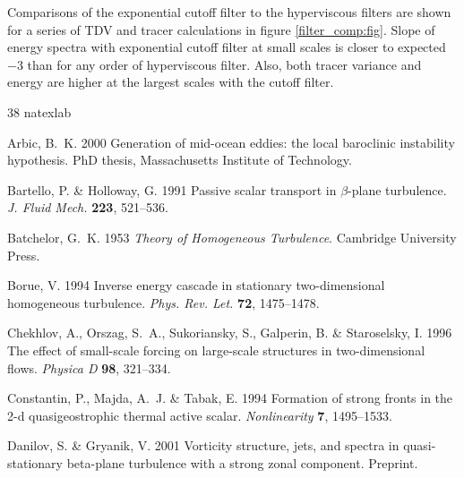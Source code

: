 \documentclass{jfm}
\begin{document}
Comparisons of the exponential cutoff filter to the hyperviscous
filters are shown for a series of TDV and tracer calculations in
figure \ref{filter_comp:fig}.  Slope of energy spectra with
exponential cutoff filter at small scales is closer to expected $-3$
than for any order of hyperviscous filter.  Also, both tracer variance
and energy are higher at the largest scales with the cutoff filter.


%


\begin{thebibliography}{38}
\expandafter\ifx\csname natexlab\endcsname\relax\def\natexlab#1{#1}\fi

{\sc Arbic, B.~K.} 2000 Generation of mid-ocean eddies: the local baroclinic
  instability hypothesis. PhD thesis, Massachusetts Institute of Technology.

{\sc Bartello, P. \& Holloway, G.} 1991 Passive scalar transport in
  $\beta$-plane turbulence. {\em J. Fluid Mech.\/} {\bf 223}, 521--536.
  
 {\sc Batchelor, G.~K.} 1953
  {\em Theory of Homogeneous Turbulence\/}. Cambridge University
  Press.

{\sc Borue, V.} 1994 Inverse energy cascade in stationary two-dimensional
  homogeneous turbulence. {\em Phys. Rev. Let.\/} {\bf 72}, 1475--1478.
  
 
 {\sc Chekhlov, A., Orszag,
    S.~A., Sukoriansky, S., Galperin, B. \& Staroselsky, I.} 1996 The
  effect of small-scale forcing on large-scale structures in
  two-dimensional flows. {\em Physica D\/} {\bf 98}, 321--334.
  
 {\sc Constantin, P., Majda, A.~J. \& Tabak, E.}
  1994 Formation of strong fronts in the 2-d quasigeostrophic thermal
  active scalar. {\em Nonlinearity\/} {\bf 7}, 1495--1533.

 {\sc Danilov, S. \&
    Gryanik, V.} 2001 Vorticity structure, jets, and spectra in
  quasi-stationary beta-plane turbulence with a strong zonal
  component.  Preprint.
  

\end{thebibliography}
\end{document}
